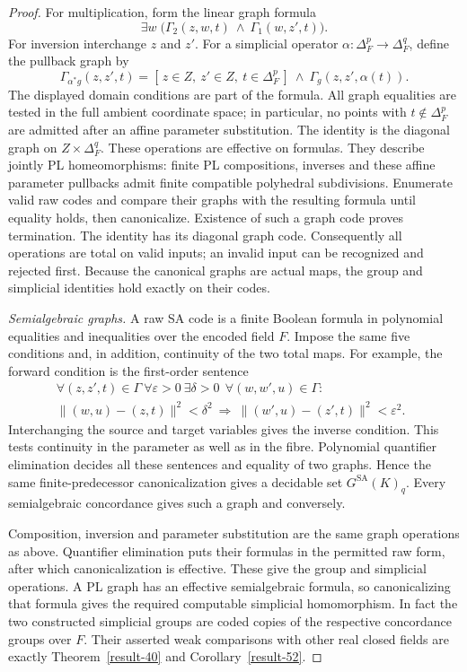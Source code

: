 \begin{proof}
For multiplication, form the linear graph formula
\[
  \exists w\;\bigl(\Gamma_2(z,w,t)\ \wedge\ \Gamma_1(w,z',t)\bigr).
\]
For inversion interchange $z$ and $z'$. For a simplicial operator
$\alpha:\Delta^p_F\to\Delta^q_F$, define the pullback graph by
\[
 \Gamma_{\alpha^*g}(z,z',t)=
 [\,z\in Z,\ z'\in Z,\ t\in\Delta^p_F\,]
 \ \wedge\ \Gamma_g(z,z',\alpha(t)).
\]
The displayed domain conditions are part of the formula. All graph
equalities are tested in the full ambient coordinate space; in
particular, no points with $t\notin\Delta^p_F$ are admitted after an
affine parameter substitution. The identity is the diagonal graph
on $Z\times\Delta^q_F$. These operations are effective on formulas.
They describe jointly PL homeomorphisms: finite PL compositions,
inverses and these affine parameter pullbacks admit finite compatible
polyhedral subdivisions.  Enumerate valid raw codes and compare their
graphs with the resulting formula until equality holds, then
canonicalize.  Existence of such a graph code proves termination.
The identity has its diagonal graph code.  Consequently all operations
are total on valid inputs; an invalid input can be recognized and
rejected first.  Because the canonical graphs are actual maps,
the group and simplicial identities hold exactly on their codes.

\medskip\noindent\textit{Semialgebraic graphs.}
A raw SA code is a finite Boolean formula in polynomial equalities
and inequalities over the encoded field $F$.  Impose the same five
conditions and, in addition, continuity of the two total maps.
For example, the forward condition is the first-order sentence
\[
\begin{split}
 \forall (z,z',t)\in\Gamma\ \forall\varepsilon>0\ \exists\delta>0\
 \ \forall(w,w',u)\in\Gamma:\qquad\qquad\qquad\quad\\
 \|(w,u)-(z,t)\|^2<\delta^2
 \ \Longrightarrow\
 \|(w',u)-(z',t)\|^2<\varepsilon^2.
\end{split}
\]
Interchanging the source and target variables gives the inverse
condition.  This tests continuity in the parameter as well as in
the fibre.  Polynomial quantifier elimination decides all these
sentences and equality of two graphs.  Hence the same finite-predecessor
canonicalization gives a decidable set $G^{\mathrm{SA}}(K)_q$.
Every semialgebraic concordance gives such a graph and conversely.

Composition, inversion and parameter substitution are the same graph
operations as above.  Quantifier elimination puts their formulas in
the permitted raw form, after which canonicalization is effective.
These give the group and simplicial operations.  A PL graph has an
effective semialgebraic formula, so canonicalizing that formula gives
the required computable simplicial homomorphism.  In fact the two
constructed simplicial groups are coded copies of the respective
concordance groups over $F$.  Their asserted weak comparisons with
other real closed fields are exactly Theorem~\ref{result-40} and
Corollary~\ref{result-52}.


\end{proof}
